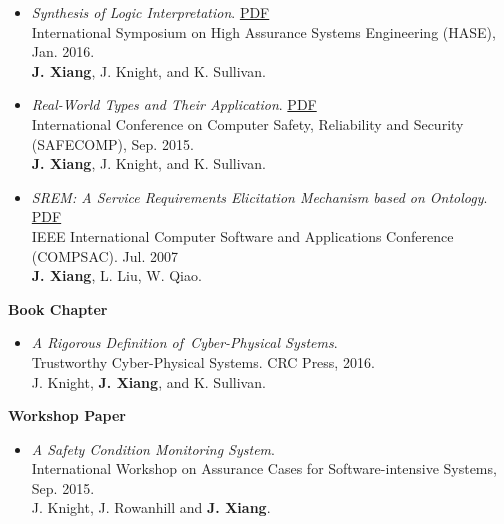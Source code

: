 \documentclass[11pt]{article}
\begin{document}
\begin{itemize}
\item \textit{Synthesis of Logic Interpretation}. \href{https://www.jianxiang.info/pub/HASE16.pdf}{PDF}  \\
  International Symposium on High Assurance Systems Engineering (HASE), Jan. 2016. \\
  \textbf{J. Xiang}, J. Knight, and K. Sullivan.
  
\item \textit{Real-World Types and Their Application}. \href{https://www.jianxiang.info/pub/safecomp15.pdf}{PDF} \\
  International Conference on Computer Safety, Reliability and Security (SAFECOMP), Sep. 2015. \\
  \textbf{J. Xiang}, J. Knight, and K. Sullivan.
  
\item \textit{SREM: A Service Requirements Elicitation Mechanism based on Ontology}. \href{https://www.jianxiang.info/pub/compsac07.pdf}{PDF} \\
  IEEE International Computer Software and Applications Conference (COMPSAC). Jul. 2007 \\
  \textbf{J. Xiang}, L. Liu, W. Qiao.  
\end{itemize}
    
    
\textbf{Book Chapter}

\begin{itemize}
\item \textit{A Rigorous Definition of Cyber-Physical Systems}. \\
  Trustworthy Cyber-Physical Systems. CRC Press, 2016.\\
  J. Knight, \textbf{J. Xiang}, and K. Sullivan. 
\end{itemize}




\textbf{Workshop Paper}
\begin{itemize}
\item
  \textit{A Safety Condition Monitoring System}. \\
  International Workshop on Assurance Cases for Software-intensive Systems, Sep. 2015. \\
  J. Knight, J. Rowanhill and \textbf{J. Xiang}.
\end{itemize}  
\end{document}
